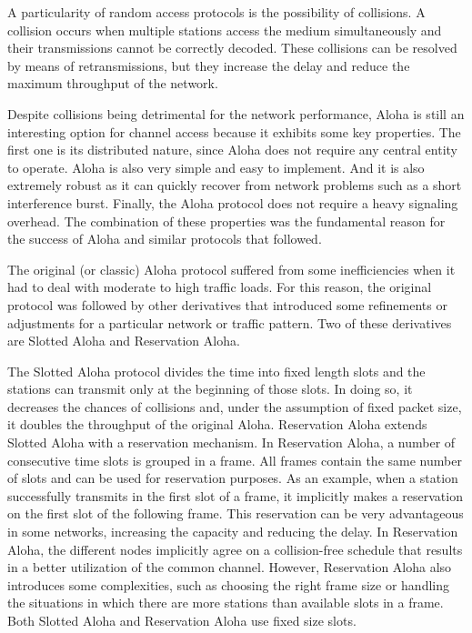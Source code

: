 \documentclass[journal]{IEEEtran}
\begin{document}
A particularity of random access protocols is the possibility of collisions.
A collision occurs when multiple stations access the medium simultaneously and their transmissions cannot be correctly decoded.
These collisions can be resolved by means of retransmissions, but they increase the delay and reduce the maximum throughput of the network.

Despite collisions being detrimental for the network performance, Aloha is still an interesting option for channel access because it exhibits some key properties.
The first one is its distributed nature, since Aloha does not require any central entity to operate.
Aloha is also very simple and easy to implement.
And it is also extremely robust as it can quickly recover from network problems such as a short interference burst.
Finally, the Aloha protocol does not require a heavy signaling overhead.
The combination of these properties was the fundamental reason for the success of Aloha and similar protocols that followed.


The original (or classic) Aloha protocol suffered from some inefficiencies when it had to deal with moderate to high traffic loads.
For this reason, the original protocol was followed by other derivatives that introduced some refinements or adjustments for a particular network or traffic pattern.
Two of these derivatives are Slotted Aloha and Reservation Aloha.

The Slotted Aloha protocol divides the time into fixed length slots and the stations can transmit only at the beginning of those slots.
In doing so, it decreases the chances of collisions and, under the assumption of fixed packet size, it doubles the throughput of the original Aloha.
Reservation Aloha \cite{crowther1973sbc} extends Slotted Aloha with a reservation mechanism.
In  Reservation Aloha, a number of consecutive  time slots is grouped in a frame.
All frames contain the same number of slots and can be used for reservation purposes.
As an example, when a station successfully transmits in the first slot of a frame, it implicitly makes a reservation on the first slot of the following frame.
This reservation can be very advantageous in some networks, increasing the capacity and reducing the delay.
In Reservation Aloha, the different nodes implicitly agree on a collision-free schedule that results in a better utilization of the common channel.
However, Reservation Aloha also introduces some complexities, such as choosing the right frame size or handling the situations in which there are more stations than available slots in a frame.
Both Slotted Aloha and Reservation Aloha use fixed size slots.
\end{document}
